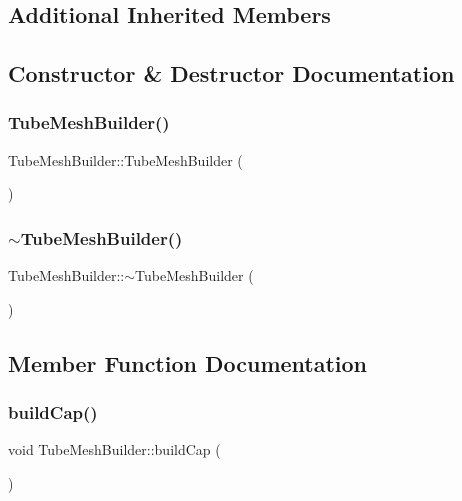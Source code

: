 \subsection*{Additional Inherited Members}


\subsection{Constructor \& Destructor Documentation}
\mbox{\label{class_tube_mesh_builder_a9c572de4c460791841bae4aa72b076c8}} 
\subsubsection{\texorpdfstring{TubeMeshBuilder()}{TubeMeshBuilder()}}
{\footnotesize\ttfamily Tube\+Mesh\+Builder\+::\+Tube\+Mesh\+Builder (\begin{DoxyParamCaption}{ }\end{DoxyParamCaption})}

\mbox{\label{class_tube_mesh_builder_a5a16887f9378a04355819176a1cd2f98}} 
\subsubsection{\texorpdfstring{$\sim$TubeMeshBuilder()}{~TubeMeshBuilder()}}
{\footnotesize\ttfamily Tube\+Mesh\+Builder\+::$\sim$\+Tube\+Mesh\+Builder (\begin{DoxyParamCaption}{ }\end{DoxyParamCaption})}



\subsection{Member Function Documentation}
\mbox{\label{class_tube_mesh_builder_a7763461e42bd9db6b7d69eb5c7ad4e05}} 
\subsubsection{\texorpdfstring{buildCap()}{buildCap()}}
{\footnotesize\ttfamily void Tube\+Mesh\+Builder\+::build\+Cap (\begin{DoxyParamCaption}{ }\end{DoxyParamCaption})\hspace{0.3cm}{\ttfamily [virtual]}}



